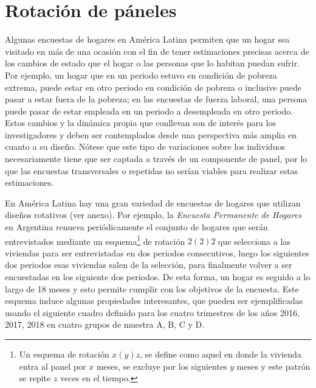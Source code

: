 \documentclass[12pt,spanish,]{book}
\let\rmarkdownfootnote\footnote%
\def\footnote{\protect\rmarkdownfootnote}
\begin{document}
\hypertarget{rotacion-de-paneles}{%
\section{Rotación de páneles}\label{rotacion-de-paneles}}

Algunas encuestas de hogares en América Latina permiten que un hogar sea visitado en más de una ocasión con el fin de tener estimaciones precisas acerca de los cambios de estado que el hogar o las personas que lo habitan puedan sufrir. Por ejemplo, un hogar que en un periodo estuvo en condición de pobreza extrema, puede estar en otro periodo en condición de pobreza o inclusive puede pasar a estar fuera de la pobreza; en las encuestas de fuerza laboral, una persona puede pasar de estar empleada en un periodo a desempleada en otro periodo. Estos cambios y la dinámica propia que conllevan son de interés para los investigadores y deben ser contemplados desde una perspectiva más amplia en cuanto a su diseño. Nótese que este tipo de variaciones sobre los individuos necesariamente tiene que ser captada a través de un componente de panel, por lo que las encuestas transversales o repetidas no serían viables para realizar estas estimaciones.

En América Latina hay una gran variedad de encuestas de hogares que utilizan diseños rotativos (ver anexo). Por ejemplo, la \emph{Encuesta Permanente de Hogares} en Argentina renueva periódicamente el conjunto de hogares que serán entrevistados mediante un esquema\footnote{Un esquema de rotación \(x(y)z\), se define como aquel en donde la vivienda entra al panel por \(x\) meses, se excluye por los siguientes \(y\) meses y este patrón se repite \(z\) veces en el tiempo.} de rotación \(2(2)2\) que selecciona a las viviendas para ser entrevistadas en dos periodos consecutivos, luego los siguientes dos periodos esas viviendas salen de la selección, para finalmente volver a ser encuestadas en los siguiente dos periodos. De esta forma, un hogar es seguido a lo largo de 18 meses y esto permite cumplir con los objetivos de la encuesta. Este esquema induce algunas propiedades interesantes, que pueden ser ejemplificadas usando el siguiente cuadro definido para los cuatro trimestres de los años 2016, 2017, 2018 en cuatro grupos de muestra A, B, C y D.
\end{document}
